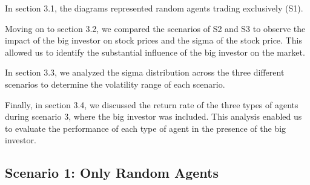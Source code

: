 \documentclass[a4paper, 12pt]{article}
\begin{document}
In section 3.1, the diagrams represented random agents trading exclusively (S1).

Moving on to section 3.2, we compared the scenarios of S2 and S3 to observe the impact of the big investor on stock prices and the sigma of the stock price. This allowed us to identify the substantial influence of the big investor on the market.

In section 3.3, we analyzed the sigma distribution across the three different scenarios to determine the volatility range of each scenario.

Finally, in section 3.4, we discussed the return rate of the three types of agents during scenario 3, where the big investor was included. This analysis enabled us to evaluate the performance of each type of agent in the presence of the big investor.\par

\subsection{Scenario 1: Only Random Agents}
\end{document}
